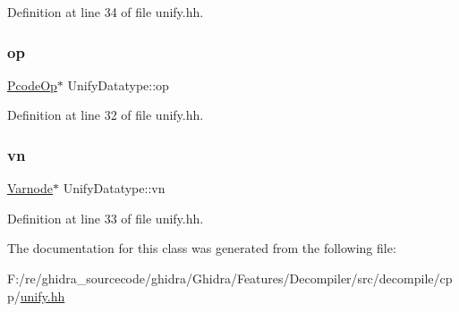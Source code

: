 Definition at line 34 of file unify.\+hh.

\mbox{\label{class_unify_datatype_ae68e76478cdd639e8f8b9a1e1267b0c3}} 
\subsubsection{\texorpdfstring{op}{op}}
{\footnotesize\ttfamily \mbox{\hyperlink{class_pcode_op}{Pcode\+Op}}$\ast$ Unify\+Datatype\+::op}



Definition at line 32 of file unify.\+hh.

\mbox{\label{class_unify_datatype_aa0cb15586729b87ed366ca69143d2b9d}} 
\subsubsection{\texorpdfstring{vn}{vn}}
{\footnotesize\ttfamily \mbox{\hyperlink{class_varnode}{Varnode}}$\ast$ Unify\+Datatype\+::vn}



Definition at line 33 of file unify.\+hh.



The documentation for this class was generated from the following file\+:\begin{DoxyCompactItemize}
\item 
F\+:/re/ghidra\+\_\+sourcecode/ghidra/\+Ghidra/\+Features/\+Decompiler/src/decompile/cpp/\mbox{\hyperlink{unify_8hh}{unify.\+hh}}\end{DoxyCompactItemize}
